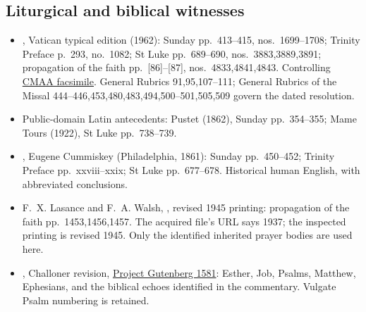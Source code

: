 \subsection{Liturgical and biblical witnesses}
\begin{itemize}
\item {}, Vatican typical edition (1962): Sunday
pp.~413--415, nos.~1699--1708; Trinity Preface p.~293, no.~1082;
St Luke pp.~689--690, nos.~3883,3889,3891; propagation of the faith
pp.~[86]--[87], nos.~4833,4841,4843. Controlling
\href{https://media.churchmusicassociation.org/pdf/missale62.pdf}{CMAA facsimile}.
General Rubrics 91,95,107--111; General Rubrics of the Missal
444--446,453,480,483,494,500--501,505,509 govern the dated resolution.
\item Public-domain Latin antecedents: Pustet 
(1862), Sunday pp.~354--355; Mame Tours 
(1922), St Luke pp.~738--739.
\item {}, Eugene Cummiskey (Philadelphia, 1861):
Sunday pp.~450--452; Trinity Preface pp.~xxviii--xxix; St Luke
pp.~677--678. Historical human English, with abbreviated conclusions.
\item F.~X. Lasance and F.~A. Walsh, ,
revised 1945 printing: propagation of the faith pp.~1453,1456,1457.
The acquired file's URL says 1937; the inspected printing is revised
1945. Only the identified inherited prayer bodies are used here.
\item {}, Challoner revision,
\href{https://www.gutenberg.org/ebooks/1581}{Project Gutenberg 1581}:
Esther, Job, Psalms, Matthew, Ephesians, and the biblical echoes
identified in the commentary. Vulgate Psalm numbering is retained.
\end{itemize}

